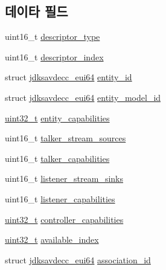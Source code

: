 \subsection*{데이타 필드}
\begin{DoxyCompactItemize}
\item 
uint16\+\_\+t \hyperlink{structjdksavdecc__descriptor__entity_ab7c32b6c7131c13d4ea3b7ee2f09b78d}{descriptor\+\_\+type}
\item 
uint16\+\_\+t \hyperlink{structjdksavdecc__descriptor__entity_a042bbc76d835b82d27c1932431ee38d4}{descriptor\+\_\+index}
\item 
struct \hyperlink{structjdksavdecc__eui64}{jdksavdecc\+\_\+eui64} \hyperlink{structjdksavdecc__descriptor__entity_a26ec635a862a0163fe5b1ff90b5f4885}{entity\+\_\+id}
\item 
struct \hyperlink{structjdksavdecc__eui64}{jdksavdecc\+\_\+eui64} \hyperlink{structjdksavdecc__descriptor__entity_a2d1d52d1ec5c6100b61acf3daa452c56}{entity\+\_\+model\+\_\+id}
\item 
\hyperlink{parse_8c_a6eb1e68cc391dd753bc8ce896dbb8315}{uint32\+\_\+t} \hyperlink{structjdksavdecc__descriptor__entity_ae3350328f131c8382ba5030939a2a484}{entity\+\_\+capabilities}
\item 
uint16\+\_\+t \hyperlink{structjdksavdecc__descriptor__entity_a9bd7d7b8ebd60d782a8b2be740355a37}{talker\+\_\+stream\+\_\+sources}
\item 
uint16\+\_\+t \hyperlink{structjdksavdecc__descriptor__entity_a51f25c5187ed3f58d17c11e1dc0f3352}{talker\+\_\+capabilities}
\item 
uint16\+\_\+t \hyperlink{structjdksavdecc__descriptor__entity_aacb4d50f4068a0a36c8746e0571bf53b}{listener\+\_\+stream\+\_\+sinks}
\item 
uint16\+\_\+t \hyperlink{structjdksavdecc__descriptor__entity_a3323f8a756edef6c94b10e2ab6c962ee}{listener\+\_\+capabilities}
\item 
\hyperlink{parse_8c_a6eb1e68cc391dd753bc8ce896dbb8315}{uint32\+\_\+t} \hyperlink{structjdksavdecc__descriptor__entity_a66f07a4a428e308f20990a0e6bbfea0c}{controller\+\_\+capabilities}
\item 
\hyperlink{parse_8c_a6eb1e68cc391dd753bc8ce896dbb8315}{uint32\+\_\+t} \hyperlink{structjdksavdecc__descriptor__entity_abbe4a72641a81cba6569feb1a446d431}{available\+\_\+index}
\item 
struct \hyperlink{structjdksavdecc__eui64}{jdksavdecc\+\_\+eui64} \hyperlink{structjdksavdecc__descriptor__entity_a0fa49c5118429af7a5ee7d71eada7b94}{association\+\_\+id}

\end{DoxyCompactItemize}
